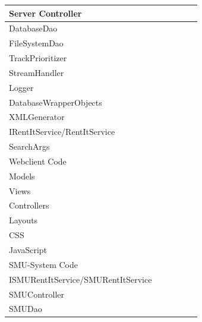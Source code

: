 \documentclass[a4paper,11pt,report]{article}
\begin{document}
\begin{figure}[htp]
\begin{tabular}{| l | l | l | l | l | l |}
  \hline
  Server Controller & \cellcolor{Gray} & \cellcolor{Gray} & \cellcolor{Gray} & \cellcolor{Gray} & \cellcolor{Gray} \\
  \hline
  DatabaseDao & \cellcolor{Gray} & \cellcolor{Gray} &  & \cellcolor{Gray} & \cellcolor{Gray}  \\
  \hline
  FileSystemDao &  & \cellcolor{Gray} &  & \cellcolor{Gray} &  \\
  \hline
  TrackPrioritizer &  & \cellcolor{Gray} &  &  &  \\
  \hline
  StreamHandler & \cellcolor{Gray} & \cellcolor{Gray} &  &  &  \\
  \hline
  Logger &  &  &  & \cellcolor{Gray} &  \\
  \hline
  DatabaseWrapperObjects &  &  &  & \cellcolor{Gray} & \cellcolor{Gray} \\
  \hline
  XMLGenerator & \cellcolor{Gray} &  &  &  &  \\
  \hline
  IRentItService/RentItService & \cellcolor{Gray} &  & \cellcolor{Gray} & \cellcolor{Gray} & \cellcolor{Gray} \\
  \hline
  SearchArgs &  &  &  &  & \cellcolor{Gray} \\
  \hline
  \multicolumn{6}{|l|}{Webclient Code} \\
  \hline
  Models & \cellcolor{Gray} &  & \cellcolor{Gray} &  & \cellcolor{Gray} \\
  \hline
  Views & \cellcolor{Gray} &  & \cellcolor{Gray} &  & \cellcolor{Gray} \\
  \hline
  Controllers & \cellcolor{Gray} &  & \cellcolor{Gray} &  & \cellcolor{Gray} \\
  \hline
  Layouts & \cellcolor{Gray} &  & \cellcolor{Gray} &  & \cellcolor{Gray} \\
  \hline
  CSS & &  & \cellcolor{Gray} &  & \cellcolor{Gray} \\
  \hline
  JavaScript &  &  &  &  & \cellcolor{Gray} \\
  \hline
  \multicolumn{6}{|l|}{SMU-System Code} \\
  \hline
  ISMURentItService/SMURentItService & \cellcolor{Gray} & \cellcolor{Gray} & \cellcolor{Gray} & \cellcolor{Gray} & \cellcolor{Gray} \\
  \hline
  SMUController & \cellcolor{Gray} & \cellcolor{Gray} & \cellcolor{Gray} & \cellcolor{Gray} & \cellcolor{Gray} \\
  \hline
  SMUDao & \cellcolor{Gray} & \cellcolor{Gray} & \cellcolor{Gray} & \cellcolor{Gray} & \cellcolor{Gray} \\

\end{tabular}
\end{figure}
\end{document}
